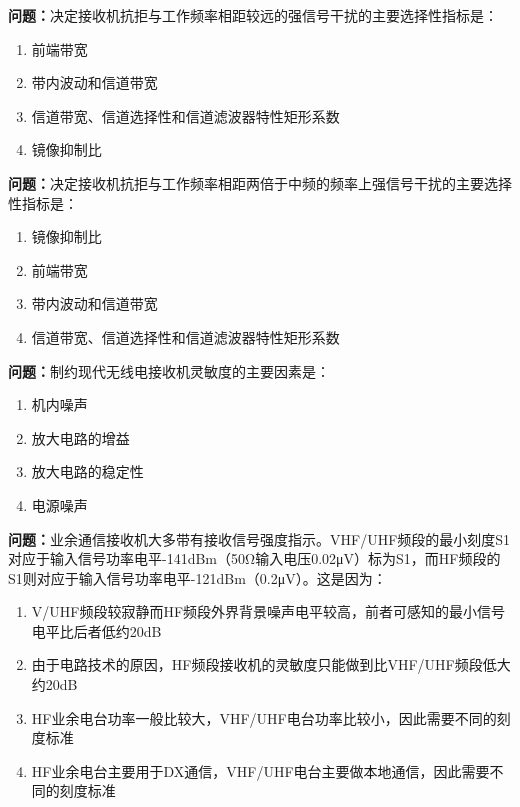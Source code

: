 \bigskip


\noindent\textbf{问题：}决定接收机抗拒与工作频率相距较远的强信号干扰的主要选择性指标是：
\begin{enumerate}[label=\Alph*), leftmargin=3em]
\item 前端带宽
\item 带内波动和信道带宽
\item 信道带宽、信道选择性和信道滤波器特性矩形系数
\item 镜像抑制比
\end{enumerate}

\bigskip


\noindent\textbf{问题：}决定接收机抗拒与工作频率相距两倍于中频的频率上强信号干扰的主要选择性指标是：
\begin{enumerate}[label=\Alph*), leftmargin=3em]
\item 镜像抑制比
\item 前端带宽
\item 带内波动和信道带宽
\item 信道带宽、信道选择性和信道滤波器特性矩形系数
\end{enumerate}

\bigskip


\noindent\textbf{问题：}制约现代无线电接收机灵敏度的主要因素是：
\begin{enumerate}[label=\Alph*), leftmargin=3em]
\item 机内噪声
\item 放大电路的增益
\item 放大电路的稳定性
\item 电源噪声
\end{enumerate}

\bigskip


\noindent\textbf{问题：}业余通信接收机大多带有接收信号强度指示。VHF/UHF频段的最小刻度S1对应于输入信号功率电平-141dBm（50Ω输入电压0.02μV）标为S1，而HF频段的S1则对应于输入信号功率电平-121dBm（0.2μV）。这是因为：
\begin{enumerate}[label=\Alph*), leftmargin=3em]
\item V/UHF频段较寂静而HF频段外界背景噪声电平较高，前者可感知的最小信号电平比后者低约20dB
\item 由于电路技术的原因，HF频段接收机的灵敏度只能做到比VHF/UHF频段低大约20dB
\item HF业余电台功率一般比较大，VHF/UHF电台功率比较小，因此需要不同的刻度标准
\item HF业余电台主要用于DX通信，VHF/UHF电台主要做本地通信，因此需要不同的刻度标准
\end{enumerate}

